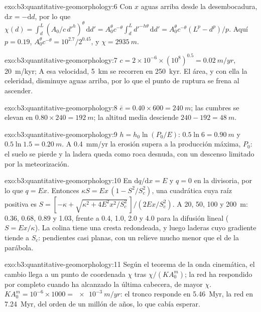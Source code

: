 \begin{solution}{exo:b3:quantitative-geomorphology:6}
Con $x$ aguas arriba desde la desembocadura, $\mathrm{d}x = -\mathrm{d}d$, por lo que $\chi(d)
= \int_d^L (A_0/c\,d'^{h})^{\theta}\,\mathrm{d}d' = A_0^{\theta} c^{-\theta}
\int_d^L d'^{-h\theta}\,\mathrm{d}d' = A_0^{\theta}c^{-\theta}(L^p -
d^p)/p$. Aquí $p = 0.19$, $A_0^{\theta}c^{-\theta} = 10^{2.7}/2^{0.45}$,
y $\chi = \qty{2935}{m}$.
\end{solution}

\begin{solution}{exo:b3:quantitative-geomorphology:7}
$c = 2\times10^{-6}\times(10^8)^{0.5} = \qty{0.02}{m/yr}$, \qty{20}{m/kyr};
A esa velocidad, \qty{5}{km} se recorren en \qty{250}{kyr}. El área, y con ella la
celeridad, disminuye aguas arriba, por lo que el punto de ruptura se frena al ascender.
\end{solution}

\begin{solution}{exo:b3:quantitative-geomorphology:8}
$\bar e = 0.40\times600 = \qty{240}{m}$; las cumbres se elevan en $0.80\times240 =
\qty{192}{m}$; la altitud media desciende $240 - 192 = \qty{48}{m}$.
\end{solution}

\begin{solution}{exo:b3:quantitative-geomorphology:9}
$h = h_0\ln(P_0/E)$: $0.5\ln 6 = \qty{0.90}{m}$ y $0.5\ln1.5 =
\qty{0.20}{m}$. A \qty{0.4}{mm/yr} la erosión supera a la producción máxima,
$P_0$: el suelo se pierde y la ladera queda como roca desnuda, con un
descenso limitado por la meteorización.
\end{solution}

\begin{solution}{exo:b3:quantitative-geomorphology:10}
En  $\mathrm{d}q/\mathrm{d}x = E$ y $q = 0$ en la divisoria, por
lo que $q = E x$. Entonces $\kappa S = E x\,(1 - S^2/S_c^2)$, una cuadrática cuya
raíz positiva es $S = [-\kappa + \sqrt{\kappa^2 + 4E^2x^2/S_c^2}\,]/(2Ex/S_c^2)$. A
20, 50, 100 y \qty{200}{m}: 0.36, 0.68, 0.89 y 1.03, frente a 0.4, 1.0,
2.0 y 4.0 para la difusión lineal ($S = Ex/\kappa$). La colina tiene una
cresta redondeada, y luego laderas cuyo gradiente tiende a $S_c$: pendientes casi planas,
con un relieve mucho menor que el de la parábola.
\end{solution}

\begin{solution}{exo:b3:quantitative-geomorphology:11}
Según el teorema de la onda cinemática, el cambio llega a un punto de coordenada
$\chi$ tras $\chi/(KA_0^m)$; la red ha respondido por completo cuando ha
alcanzado la última cabecera, de mayor $\chi$. $K A_0^m = 10^{-6}\times
1000 = \qty{e-3}{m/yr}$: el tronco responde en \qty{5.46}{Myr}, la red
en \qty{7.24}{Myr}, del orden de un millón de años, lo que cabía esperar.
\end{solution}

